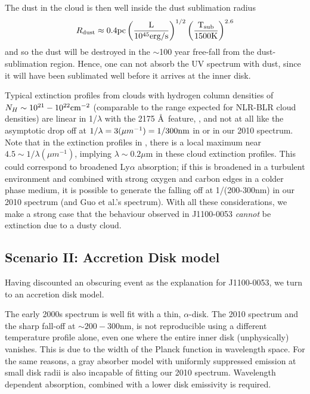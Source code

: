 \documentclass[11pt,a4paper]{article}
\begin{document}
The dust in the cloud is then well inside the dust sublimation radius
\begin{equation}
    R_{\rm dust} \approx 0.4\rm{pc}\left(\frac{L}{10^{45}\rm{erg/s}}\right)^{1/2}
                                                   \left(\frac{T_{\rm sub}}{1500\rm{K}}\right)^{2.6}
\end{equation}
and so the dust will be destroyed in the $\sim$100 year free-fall from
the dust-sublimation region. Hence, one can not absorb the UV spectrum
with dust, since it will have been sublimated well before it arrives
at the inner disk.

Typical extinction profiles from clouds with hydrogen column densities
of $N_{H} \sim 10^{21}-10^{22} \rm{cm}^{-2}$ (comparable to the range
expected for NLR-BLR cloud densities) are linear in 
1/$\lambda$ with the 2175 \AA\ feature, \citep[e.g., Figure 4
of][]{Gordon2003}, and not at all like the asymptotic drop off at
$1/\lambda=3 (\mu m^{-1})=1/300\rm{nm}$ in \citet{Guo2016} or in our
2010 spectrum. Note that in the extinction profiles in
\citet{Gordon2003}, there is a local maximum near $4.5 \sim 1/\lambda (\mu
m^{-1})$, implying $\lambda \sim 0.2\mu$m in these
cloud extinction profiles. %
This could correspond to broadened Ly$\alpha$ absorption;
if this is broadened in a turbulent environment and combined with
strong oxygen and carbon edges in a colder phase medium, it is possible to
generate the falling off at 1/(200-300nm) in our 2010 spectrum (and
Guo et al.'s spectrum). With all these considerations, we make a strong case
that the behaviour observed in J1100-0053 \emph{cannot} be extinction due
to a dusty cloud.


\subsection*{Scenario II: Accretion Disk model}
Having discounted an obscuring event as the explanation for J1100-0053,
we turn to an accretion disk model.

The early 2000s spectrum is well fit with a thin, \citet{SS73} $\alpha$-disk. The 2010 spectrum and the sharp fall-off at $\sim 200-300$nm, is not reproducible using a different temperature profile alone, even one where the entire inner disk (unphysically) vanishes. This is due to the width of the Planck function in wavelength space. For the same reasons, a gray absorber model with uniformly suppressed emission at small disk radii is also incapable of fitting our 2010 \citep[or ][]{Guo2016} spectrum. Wavelength dependent absorption, combined with a lower disk emissivity is required. 
\end{document}
